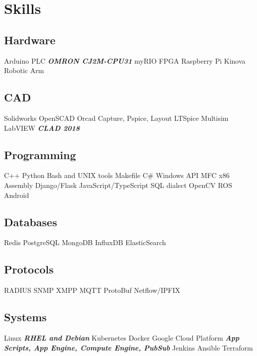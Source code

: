 \documentclass[letterpaper]{deedy-resume} %
\begin{document}
\begin{minipage}[t]{0.33\textwidth}
\section{Skills}

\subsection{Hardware}
Arduino \textbullet{} PLC {\footnotesize \textit{\textbf{OMRON CJ2M-CPU31}}}
\textbullet{} myRIO \textbullet{} FPGA \textbullet{} Raspberry Pi
\textbullet{} Kinova Robotic Arm

\sectionspace

\subsection{CAD}
Solidworks \textbullet{} OpenSCAD
\textbullet{} Orcad Capture, Pspice, Layout 
\textbullet{} LTSpice \textbullet{} Multisim 
\textbullet{} LabVIEW {\footnotesize \textit{\textbf{CLAD 2018}}}

\sectionspace

\subsection{Programming}
C++ \textbullet{} Python \textbullet{} Bash and UNIX tools  
Makefile \textbullet{} C\# 
\textbullet{} Windows API \textbullet{} MFC  \textbullet{} x86 Assembly 
\textbullet{} Django/Flask \textbullet{} JavaScript/TypeScript \textbullet{} SQL dialect 
\textbullet{} OpenCV \textbullet{} ROS \textbullet{} Android 


\sectionspace

\subsection{Databases}
Redis \textbullet{} PostgreSQL \textbullet{} MongoDB
\textbullet{} InfluxDB \textbullet{} ElasticSearch 

\sectionspace

\subsection{Protocols}
RADIUS \textbullet{} SNMP \textbullet{} XMPP
\textbullet{} MQTT \textbullet{} ProtoBuf \textbullet{} Netflow/IPFIX

\sectionspace

\subsection{Systems}
Linux {\footnotesize \textit{\textbf{RHEL and Debian}}} \textbullet{} Kubernetes 
\textbullet{} Docker \textbullet{} Google Cloud Platform {\footnotesize \textit{\textbf{App Scripts, App Engine, Compute Engine, PubSub}}} 
\textbullet{} Jenkins \textbullet{} Ansible \textbullet{} Terraform 

\sectionspace %


\end{minipage} %
\end{document}
